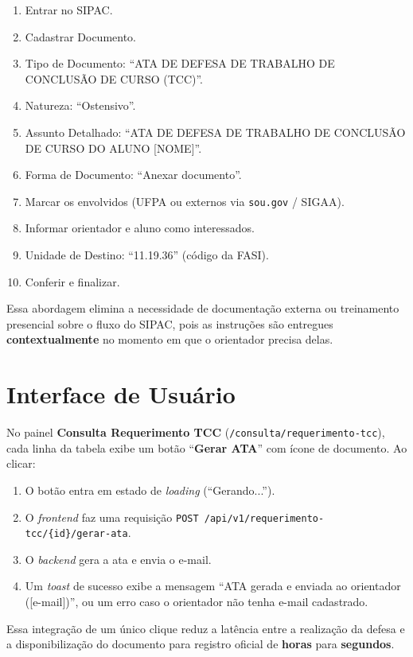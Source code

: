 \documentclass[12pt,a4paper]{report}
\begin{document}
\begin{enumerate}
  \item Entrar no SIPAC.
  \item Cadastrar Documento.
  \item Tipo de Documento: ``ATA DE DEFESA DE TRABALHO DE CONCLUSÃO DE CURSO
        (TCC)''.
  \item Natureza: ``Ostensivo''.
  \item Assunto Detalhado: ``ATA DE DEFESA DE TRABALHO DE CONCLUSÃO DE CURSO
        DO ALUNO [NOME]''.
  \item Forma de Documento: ``Anexar documento''.
  \item Marcar os envolvidos (UFPA ou externos via \texttt{sou.gov} / SIGAA).
  \item Informar orientador e aluno como interessados.
  \item Unidade de Destino: ``11.19.36'' (código da FASI).
  \item Conferir e finalizar.
\end{enumerate}

Essa abordagem elimina a necessidade de documentação externa ou treinamento
presencial sobre o fluxo do SIPAC, pois as instruções são entregues
\textbf{contextualmente} no momento em que o orientador precisa delas.

\section{Interface de Usuário}

No painel \textbf{Consulta Requerimento TCC}
(\texttt{/consulta/requerimento-tcc}), cada linha da tabela exibe um botão
``\textbf{Gerar ATA}'' com ícone de documento. Ao clicar:

\begin{enumerate}
  \item O botão entra em estado de \textit{loading} (``Gerando...'').
  \item O \textit{frontend} faz uma requisição \texttt{POST
        /api/v1/requerimento-tcc/\{id\}/gerar-ata}.
  \item O \textit{backend} gera a ata e envia o e-mail.
  \item Um \textit{toast} de sucesso exibe a mensagem ``ATA gerada e enviada
        ao orientador ([e-mail])'', ou um erro caso o orientador não tenha
        e-mail cadastrado.
\end{enumerate}

Essa integração de um único clique reduz a latência entre a realização da
defesa e a disponibilização do documento para registro oficial de
\textbf{horas} para \textbf{segundos}.
\end{document}
